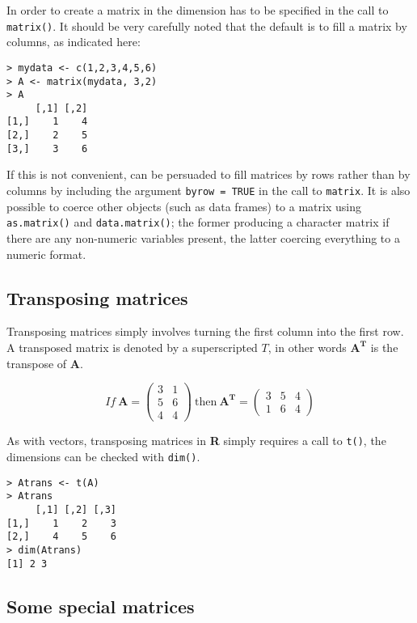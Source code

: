 In order to create a matrix in \R the dimension has to be specified in the call to \verb+matrix()+.   It should be very carefully noted that the default is to fill a matrix by columns, as indicated here:
\singlespacing
\begin{verbatim}
> mydata <- c(1,2,3,4,5,6)
> A <- matrix(mydata, 3,2)
> A
     [,1] [,2]
[1,]    1    4
[2,]    2    5
[3,]    3    6
\end{verbatim}
\onehalfspacing
If this is not convenient, \R can be persuaded to fill matrices by rows rather than by columns by including the argument \verb+byrow = TRUE+ in the call to \verb+matrix+.   It is also possible to coerce other objects (such as data frames) to a matrix using \verb+as.matrix()+ and \verb+data.matrix()+; the former producing a character matrix if there are any non-numeric variables present, the latter coercing everything to a numeric format.

\subsection{Transposing matrices}
\label{matrixtranspose}

Transposing matrices simply involves turning the first column into the first row.   A transposed matrix is denoted by a superscripted $T$, in other words $\mathbf{A^{T}}$ is the transpose of $\mathbf{A}$.

\begin{displaymath}
If\ \mathbf{A} = \left(
\begin{array}{rr}
3 &   1\\
5 &    6\\
4 &   4
\end{array}
\right)
\ \mbox{then}\ \mathbf{A^{T}} =
\left( \begin{array}{rrr}
3 &   5 &   4\\
1 &   6  &  4
\end{array}
\right)
\end{displaymath}

As with vectors, transposing matrices in \textbf{R} simply requires a call to \verb+t()+, the dimensions can be checked with  \verb+dim()+.

\singlespacing
\begin{verbatim}
> Atrans <- t(A)
> Atrans
     [,1] [,2] [,3]
[1,]    1    2    3
[2,]    4    5    6
> dim(Atrans)
[1] 2 3
\end{verbatim}
\onehalfspacing


\subsection{Some special matrices}
\label{specialmatrix}

